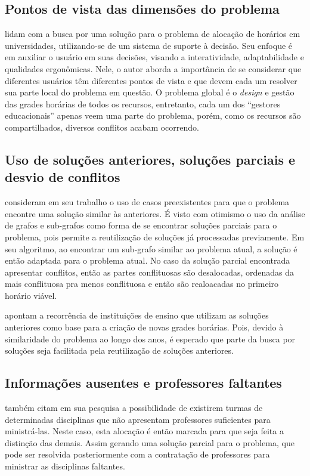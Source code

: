 \subsection{Pontos de vista das dimensões do problema} \label{ssec:pontos}                                %

 lidam com a busca por uma solução para o problema de alocação de horários em universidades, utilizando-se de um sistema de suporte à decisão. Seu enfoque é em auxiliar o usuário em suas decisões, visando a interatividade, adaptabilidade e qualidades ergonômicas. Nele, o autor aborda a importância de se considerar que diferentes usuários têm diferentes pontos de vista e que devem cada um resolver sua parte local do problema em questão. O problema global é o \textit{design} e gestão das grades horárias de todos os recursos, entretanto, cada um dos ``gestores educacionais'' apenas veem uma parte do problema, porém, como os recursos são compartilhados, diversos conflitos acabam ocorrendo.

\subsection{Uso de soluções anteriores, soluções parciais e desvio de conflitos} \label{ssec:parciais}    %

 consideram em seu trabalho o uso de casos preexistentes para que o problema encontre uma solução similar às anteriores. É visto com otimismo o uso da análise de grafos e sub-grafos como forma de se encontrar soluções parciais para o problema, pois permite a reutilização de soluções já processadas previamente. Em seu algoritmo, ao encontrar um sub-grafo similar ao problema atual, a solução é então adaptada para o problema atual. No caso da solução parcial encontrada apresentar conflitos, então as partes conflituosas são desalocadas, ordenadas da mais conflituosa pra menos conflituosa e então são realoacadas no primeiro horário viável.

 apontam a recorrência de instituições de ensino que utilizam as soluções anteriores como base para a criação de novas grades horárias. Pois, devido à similaridade do problema ao longo dos anos, é esperado que parte da busca por soluções seja facilitada pela reutilização de soluções anteriores.

\subsection{Informações ausentes e professores faltantes} \label{ssec:ausentes}                            %

 também citam em sua pesquisa a possibilidade de existirem turmas de determinadas disciplinas que não apresentam professores suficientes para ministrá-las. Neste caso, esta alocação é então marcada para que seja feita a distinção das demais. Assim gerando uma solução parcial para o problema, que pode ser resolvida posteriormente com a contratação de professores para ministrar as disciplinas faltantes.
